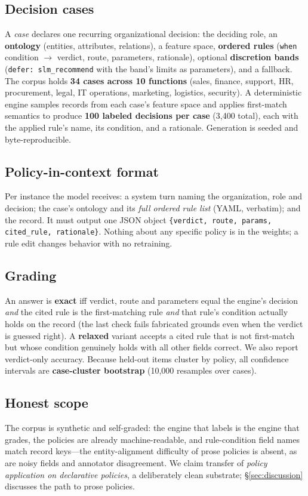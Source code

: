 \documentclass[11pt]{article}
\begin{document}
\subsection{Decision cases}
A \emph{case} declares one recurring organizational decision: the deciding role, an \textbf{ontology} (entities, attributes, relations), a feature space, \textbf{ordered rules} (\texttt{when} condition $\rightarrow$ verdict, route, parameters, rationale), optional \textbf{discretion bands} (\texttt{defer: slm\_recommend} with the band's limits as parameters), and a fallback. The corpus holds \textbf{34 cases across 10 functions} (sales, finance, support, HR, procurement, legal, IT operations, marketing, logistics, security). A deterministic engine samples records from each case's feature space and applies first-match semantics to produce \textbf{100 labeled decisions per case} (3{,}400 total), each with the applied rule's name, its condition, and a rationale. Generation is seeded and byte-reproducible.

\subsection{Policy-in-context format}
Per instance the model receives: a system turn naming the organization, role and decision; the case's ontology and its \emph{full ordered rule list} (YAML, verbatim); and the record. It must output one JSON object \texttt{\{verdict, route, params, cited\_rule, rationale\}}. Nothing about any specific policy is in the weights; a rule edit changes behavior with no retraining.

\subsection{Grading}\label{sec:grading}
An answer is \textbf{exact} iff verdict, route and parameters equal the engine's decision \emph{and} the cited rule is the first-matching rule \emph{and} that rule's condition actually holds on the record (the last check fails fabricated grounds even when the verdict is guessed right). A \textbf{relaxed} variant accepts a cited rule that is not first-match but whose condition genuinely holds with all other fields correct. We also report verdict-only accuracy. Because held-out items cluster by policy, all confidence intervals are \textbf{case-cluster bootstrap} (10{,}000 resamples over cases).

\subsection{Honest scope}\label{sec:scope}
The corpus is synthetic and self-graded: the engine that labels is the engine that grades, the policies are already machine-readable, and rule-condition field names match record keys---the entity-alignment difficulty of prose policies is absent, as are noisy fields and annotator disagreement. We claim transfer of \emph{policy application on declarative policies}, a deliberately clean substrate; \S\ref{sec:discussion} discusses the path to prose policies.
\end{document}
